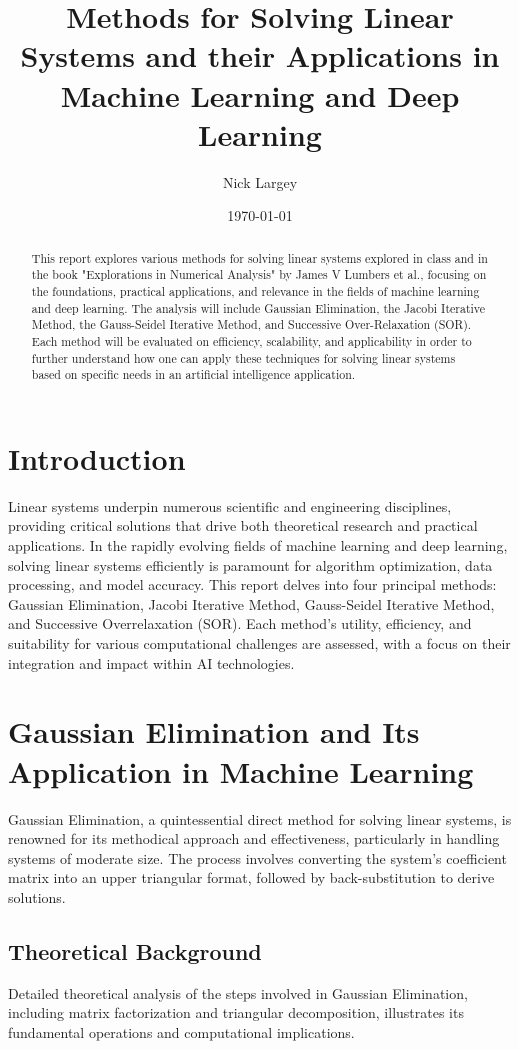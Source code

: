 \documentclass{article}
\title{Methods for Solving Linear Systems and their Applications in Machine Learning and Deep Learning}
\author{Nick Largey}
\date{\today}
\begin{document}
\maketitle

\begin{abstract}
This report explores various methods for solving linear systems explored in class and in the book "Explorations in Numerical Analysis" by James V Lumbers et al., focusing on the foundations, practical applications, and relevance in the fields of machine learning and deep learning. The analysis will include Gaussian Elimination, the Jacobi Iterative Method, the Gauss-Seidel Iterative Method, and Successive Over-Relaxation (SOR). Each method will be evaluated on efficiency, scalability, and applicability in order to further understand how one can apply these techniques for solving linear systems based on specific needs in an artificial intelligence application.
\end{abstract}

\section{Introduction}
Linear systems underpin numerous scientific and engineering disciplines, providing critical solutions that drive both theoretical research and practical applications. In the rapidly evolving fields of machine learning and deep learning, solving linear systems efficiently is paramount for algorithm optimization, data processing, and model accuracy. This report delves into four principal methods: Gaussian Elimination, Jacobi Iterative Method, Gauss-Seidel Iterative Method, and Successive Overrelaxation (SOR). Each method's utility, efficiency, and suitability for various computational challenges are assessed, with a focus on their integration and impact within AI technologies.

\section{Gaussian Elimination and Its Application in Machine Learning}
Gaussian Elimination, a quintessential direct method for solving linear systems, is renowned for its methodical approach and effectiveness, particularly in handling systems of moderate size. The process involves converting the system's coefficient matrix into an upper triangular format, followed by back-substitution to derive solutions.

\subsection{Theoretical Background}
Detailed theoretical analysis of the steps involved in Gaussian Elimination, including matrix factorization and triangular decomposition, illustrates its fundamental operations and computational implications.
\end{document}
